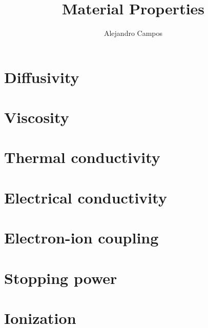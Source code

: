 \documentclass[a4paper,11pt]{report}
\title{Material Properties}
\author{Alejandro Campos}
\begin{document}
\maketitle
\tableofcontents

\chapter{Diffusivity}

\chapter{Viscosity}

\chapter{Thermal conductivity}

\chapter{Electrical conductivity}

\chapter{Electron-ion coupling}

\chapter{Stopping power}

\chapter{Ionization}
\end{document}
